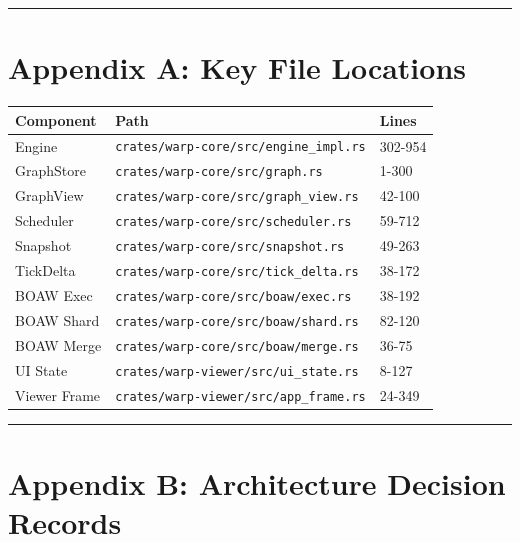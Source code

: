 \documentclass[
]{book}
\newcounter{none} %
\begin{document}
\begin{center}\rule{0.5\linewidth}{0.5pt}\end{center}

\section{Appendix A: Key File
Locations}\label{appendix-a-key-file-locations}

{\def\LTcaptype{none} %
\begin{longtable}[]{@{}lll@{}}
\toprule\noalign{}
Component & Path & Lines \\
\midrule\noalign{}
\endhead
\bottomrule\noalign{}
\endlastfoot
Engine & \texttt{crates/warp-core/src/engine\_impl.rs} & 302-954 \\
GraphStore & \texttt{crates/warp-core/src/graph.rs} & 1-300 \\
GraphView & \texttt{crates/warp-core/src/graph\_view.rs} & 42-100 \\
Scheduler & \texttt{crates/warp-core/src/scheduler.rs} & 59-712 \\
Snapshot & \texttt{crates/warp-core/src/snapshot.rs} & 49-263 \\
TickDelta & \texttt{crates/warp-core/src/tick\_delta.rs} & 38-172 \\
BOAW Exec & \texttt{crates/warp-core/src/boaw/exec.rs} & 38-192 \\
BOAW Shard & \texttt{crates/warp-core/src/boaw/shard.rs} & 82-120 \\
BOAW Merge & \texttt{crates/warp-core/src/boaw/merge.rs} & 36-75 \\
UI State & \texttt{crates/warp-viewer/src/ui\_state.rs} & 8-127 \\
Viewer Frame & \texttt{crates/warp-viewer/src/app\_frame.rs} & 24-349 \\
\end{longtable}
}

\begin{center}\rule{0.5\linewidth}{0.5pt}\end{center}

\section{Appendix B: Architecture Decision
Records}\label{appendix-b-architecture-decision-records}
\end{document}
